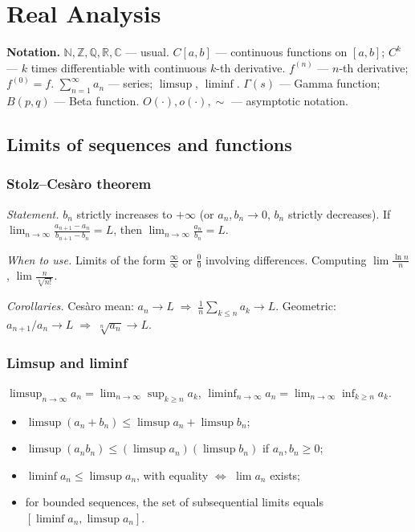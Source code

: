 \chapter{Real Analysis}
\label{ch:calculus}

\medskip

\textbf{Notation.} $\mathbb{N},\mathbb{Z},\mathbb{Q},\mathbb{R},\mathbb{C}$ --- usual.
$C[a,b]$ --- continuous functions on $[a,b]$; $C^k$ --- $k$ times differentiable with continuous $k$-th derivative.
$f^{(n)}$ --- $n$-th derivative; $f^{(0)}=f$.
$\displaystyle\sum_{n=1}^\infty a_n$ --- series; $\displaystyle\limsup$, $\displaystyle\liminf$.
$\Gamma(s)$ --- Gamma function; $B(p,q)$ --- Beta function.
$O(\cdot),o(\cdot),\sim$ --- asymptotic notation.

\medskip

\section{Limits of sequences and functions}
\label{sec:limits}

\subsection{Stolz--Ces\`aro theorem}
\label{subsec:stolz-cesaro}

\textit{Statement.} $b_n$ strictly increases to $+\infty$ (or $a_n,b_n\to0$, $b_n$ strictly decreases). If $\displaystyle\lim_{n\to\infty}\frac{a_{n+1}-a_n}{b_{n+1}-b_n}=L$, then $\displaystyle\lim_{n\to\infty}\frac{a_n}{b_n}=L$.

\textit{When to use.} Limits of the form $\frac{\infty}{\infty}$ or $\frac{0}{0}$ involving differences. Computing $\lim \frac{\ln n}{n}$, $\lim \frac{n}{\sqrt[n]{n!}}$.

\textit{Corollaries.} Ces\`aro mean: $a_n\to L\;\Rightarrow\; \frac1n\sum_{k\leq n}a_k\to L$. Geometric: $a_{n+1}/a_n\to L\;\Rightarrow\;\sqrt[n]{a_n}\to L$.

\medskip

\subsection{Limsup and liminf}
\label{subsec:limsup-liminf}

$\displaystyle\limsup_{n\to\infty} a_n = \lim_{n\to\infty}\sup_{k\ge n} a_k$, $\displaystyle\liminf_{n\to\infty} a_n = \lim_{n\to\infty}\inf_{k\ge n} a_k$.
\begin{itemize}
  \item $\limsup (a_n+b_n)\le\limsup a_n+\limsup b_n$;
  \item $\limsup (a_n b_n)\le(\limsup a_n)(\limsup b_n)$ if $a_n,b_n\ge0$;
  \item $\liminf a_n\le\limsup a_n$, with equality $\iff$ $\lim a_n$ exists;
  \item for bounded sequences, the set of subsequential limits equals $[\liminf a_n,\limsup a_n]$.
\end{itemize}


